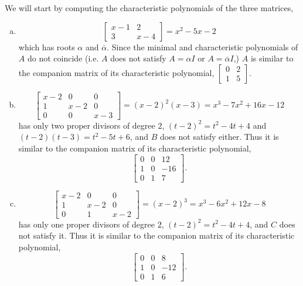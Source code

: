 \documentclass{article}
\newenvironment{problem}[2][Problem]{\begin{trivlist}
\item[\hskip \labelsep {\bfseries #1}\hskip \labelsep {\bfseries #2.}]}{\end{trivlist}}
\begin{document}
\begin{problem}{8.31 (Rotman)} %
  We will start by computing the characteristic polynomials of the three
  matrices, \begin{enumerate}[(a)]
    \item \[
      \begin{bmatrix} x - 1 & 2 \\ 3 & x - 4 \end{bmatrix} = x^2 - 5x - 2
    \] which has roots $\alpha$ and $\overline\alpha$. Since the minimal and characteristic polynomials of $A$ do not coincide (i.e. $A$ does not satisfy $A = \alpha I$ or $A = \overline\alpha I$,) $A$ is similar to the companion matrix of its characteristic polynomial,
    $\begin{bmatrix} 0 & 2 \\ 1 & 5 \end{bmatrix}$.
    \item \[
      \begin{bmatrix} x - 2 & 0 & 0 \\ 1 & x - 2 & 0 \\ 0 & 0 & x - 3 \end{bmatrix} = (x-2)^2(x-3) = x^3 - 7 x^2 + 16 x - 12
    \] has only two proper divisors of degree $2$, $(t-2)^2 = t^2 - 4t + 4$ and $(t-2)(t-3) = t^2 - 5t + 6$, and $B$ does not satisfy either. Thus it is similar to the companion matrix of its characteristic polynomial, \[
      \begin{bmatrix} 0 & 0 & 12 \\ 1 & 0 & -16 \\ 0 & 1 & 7 \end{bmatrix}.
    \]
    \item \[
      \begin{bmatrix} x - 2 & 0 & 0 \\ 1 & x - 2 & 0 \\ 0 & 1 & x - 2 \end{bmatrix} = (x-2)^3 = x^3 - 6 x^2 + 12 x - 8
    \] has only one proper divisors of degree $2$, $(t-2)^2 = t^2 - 4t + 4$, and $C$ does not satisfy it. Thus it is similar to the companion matrix of its characteristic polynomial, \[
      \begin{bmatrix} 0 & 0 & 8 \\ 1 & 0 & -12 \\ 0 & 1 & 6 \end{bmatrix}.
    \]
  \end{enumerate}
\end{problem}
\end{document}
